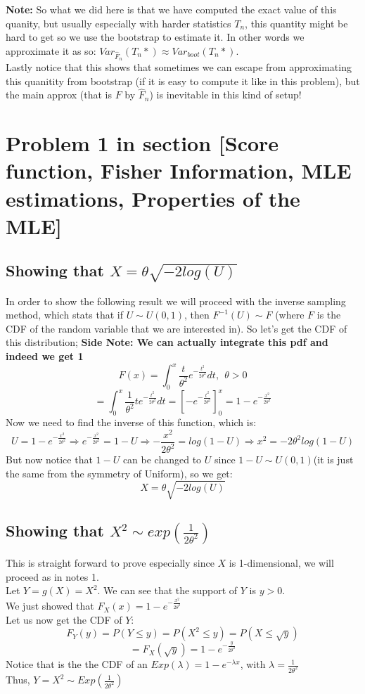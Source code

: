 \documentclass[12pt]{article}
\begin{document}
\textbf{Note:} So what we did here is that we have computed the exact value of this quanity, but usually especially with harder statistics $T_n$, this quantity might be hard to get so we use the bootstrap to estimate it. In other words we approximate it as so:  $Var_{\hat{F}_n}(T_n*) \approx Var_{boot}(T_n*)$. \\
Lastly notice that this shows that sometimes we can escape from approximating this quanitity from bootstrap (if it is easy to compute it like in this problem), but the main approx (that is $F$ by $\hat{F}_n$) is inevitable in this kind of setup!

\section*{Problem 1 in section [Score function, Fisher Information, MLE estimations, Properties of the MLE]} 
\subsection*{Showing that $X = \theta \sqrt{-2log(U)}$}
In order to show the following result we will proceed with the inverse sampling method, which stats that if $U \sim U(0,1)$, then $F^{-1}(U) \sim F$ (where $F$ is the CDF of the random variable that we are interested in). So let's get the CDF of this distribution;
\textbf{Side Note: We can actually integrate this pdf and indeed we get 1} \\
\[
  F(x) = \int_{0}^{x} \frac{t}{\theta^2}e^{-\frac{t^2}{2\theta^2}} dt, \ \ \theta > 0
\]
\[
  = \int_{0}^{x} \frac{1}{\theta^2}te^{-\frac{t^2}{2\theta^2}} dt = \left[ -e^{-\frac{t^2}{2\theta^2}} \right]_{0}^{x} = 1 - e^{-\frac{x^2}{2\theta^2}}
\]
Now we need to find the inverse of this function, which is:
\[
  U = 1 - e^{-\frac{x^2}{2\theta^2}} \Rightarrow e^{-\frac{x^2}{2\theta^2}} = 1 - U \Rightarrow -\frac{x^2}{2\theta^2} = log(1-U) \Rightarrow x^2 = -2\theta^2 log(1-U)
\]
But now notice that $1-U$ can be changed to $U$ since $1-U \sim U(0,1)$(it is just the same from the symmetry of Uniform), so we get:
\[
  X = \theta \sqrt{-2log(U)}
\]
\subsection*{Showing that $X^2 \sim exp(\frac{1}{2\theta^2})$}
This is straight forward to prove especially since $X$ is 1-dimensional, we will proceed as in notes 1. \\
Let $Y = g(X) = X^2$.
We can see that the support of $Y$ is $y>0$. \\
We just showed that $F_X(x) = 1- e^{-\frac{x^2}{2\theta^2}}$\\
Let us now get the CDF of $Y$:
\[
  F_Y(y) = P( Y \leq y) = P(X^2 \leq y) = P(X \leq \sqrt{y})
\]
\[
  = F_X(\sqrt{y}) = 1 - e^{-\frac{y}{2\theta^2}}
\]
Notice that is the the CDF of an $Exp(\lambda) = 1-e^{-\lambda x}$, with $\lambda = \frac{1}{2\theta^2}$\\
Thus, $Y=X^2 \sim Exp(\frac{1}{2\theta^2})$
\end{document}
